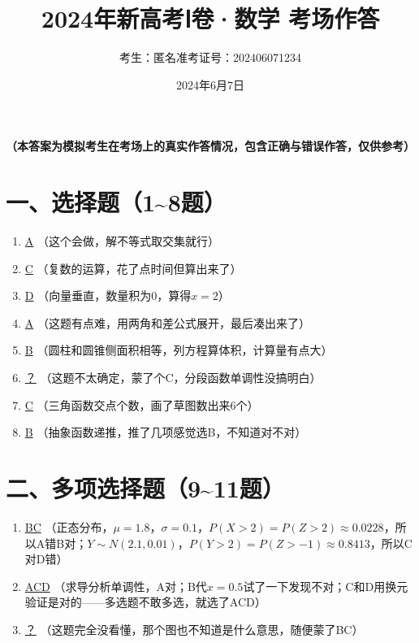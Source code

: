 \documentclass[12pt,a4paper]{article}
\title{2024年新高考Ⅰ卷·数学 考场作答}
\author{考生：匿名\quad 准考证号：202406071234}
\date{2024年6月7日}
\begin{document}
\maketitle

\begin{center}
{\large \textbf{（本答案为模拟考生在考场上的真实作答情况，包含正确与错误作答，仅供参考）}}
\end{center}

\section*{一、选择题（1\~{}8题）}

\begin{enumerate}[label=\arabic*.]
\item \underline{A} \quad （这个会做，解不等式取交集就行）

\item \underline{C} \quad （复数的运算，花了点时间但算出来了）

\item \underline{D} \quad （向量垂直，数量积为0，算得$x=2$）

\item \underline{A} \quad （这题有点难，用两角和差公式展开，最后凑出来了）

\item \underline{B} \quad （圆柱和圆锥侧面积相等，列方程算体积，计算量有点大）

\item \underline{？} \quad （这题不太确定，蒙了个C，分段函数单调性没搞明白）

\item \underline{C} \quad （三角函数交点个数，画了草图数出来6个）

\item \underline{B} \quad （抽象函数递推，推了几项感觉选B，不知道对不对）
\end{enumerate}

\section*{二、多项选择题（9\~{}11题）}

\begin{enumerate}[label=\arabic*.]
\item \underline{BC} \quad （正态分布，$\mu=1.8$，$\sigma=0.1$，$P(X>2)=P(Z>2)\approx0.0228$，所以A错B对；$Y\sim N(2.1,0.01)$，$P(Y>2)=P(Z>-1)\approx0.8413$，所以C对D错）

\item \underline{ACD} \quad （求导分析单调性，A对；B代$x=0.5$试了一下发现不对；C和D用换元验证是对的——多选题不敢多选，就选了ACD）

\item \underline{？} \quad （这题完全没看懂，那个图也不知道是什么意思，随便蒙了BC）
\end{enumerate}
\end{document}
